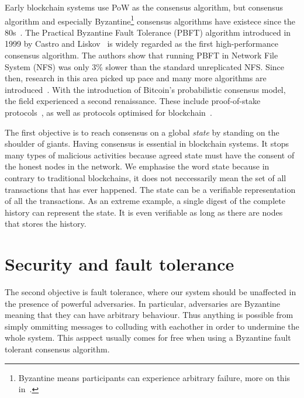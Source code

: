 Early blockchain systems use PoW as the consensus algorithm,
but consensus algorithm and especially Byzantine\footnote{Byzantine means participants can experience arbitrary failure, more on this in~.}
consensus algorithms have existece since the 80s~\cite{pease1980reaching, lamport1982byzantine}.
The Practical Byzantine Fault Tolerance (PBFT) algorithm introduced in 1999 by Castro and Liskov~\cite{castro1999practical} is widely regarded as the first high-performance consensus algorithm.
The authors show that running PBFT in Network File System (NFS) was only 3\% slower than the standard unreplicated NFS.
Since then, research in this area picked up pace and many more algorithms are introduced~\cite{abd2005fault, kotla2007zyzzyva}.
With the introduction of Bitcoin's probabilistic consensus model, the field experienced a second renaissance.
These include proof-of-stake protocols~\cite{bentov2016snow, micali2016algorand}, as well as protocols optimised for blockchain~\cite{liu2016xft, miller2016honey}.

The first objective is to reach consensus on a global \emph{state} by standing on the shoulder of giants.
Having consensus is essential in blockchain systems.
It stops many types of malicious activities because agreed state must have the consent of the honest nodes in the network.
We emphasise the word state because in contrary to traditional blockchains,
it does not neccessarily mean the set of all transactions that has ever happened.
The state can be a verifiable representation of all the transactions.
As an extreme example, a single digest of the complete history can represent the state.
It is even verifiable as long as there are nodes that stores the history.


\section{Security and fault tolerance}

The second objective is fault tolerance,
where our system should be unaffected in the presence of powerful adversaries.
In particular, adversaries are Byzantine meaning that they can have arbitrary behaviour.
Thus anything is possible from simply ommitting messages to colluding with eachother in order to undermine the whole system.
This asppect usually comes for free when using a Byzantine fault tolerant consensus algorithm.

